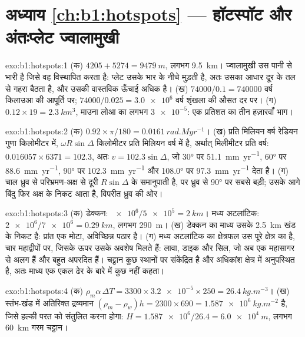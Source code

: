 \section*{अध्याय \ref{ch:b1:hotspots} --- हॉटस्पॉट और अंतःप्लेट ज्वालामुखी}

\begin{solution}{exo:b1:hotspots:1}
(क) $4205 + 5274 = \qty{9479}{m}$, लगभग \qty{9.5}{km}। ज्वालामुखी उस पानी से भारी है जिसे वह विस्थापित करता है: प्लेट उसके भार के नीचे मुड़ती है, अतः उसका आधार दूर के तल से गहरा बैठता है, और उसकी वास्तविक ऊँचाई अधिक है। (ख) $74000/0.1 = \num{740000}$ वर्ष किलाउआ की आपूर्ति पर; $74000/0.025 = \num{3.0e6}$ वर्ष शृंखला की औसत दर पर। (ग) $0.12\times19 = \qty{2.3}{km^3}$, माउना लोआ का लगभग $\num{3e-5}$: एक प्रतिशत का तीन हज़ारवाँ भाग।
\end{solution}

\begin{solution}{exo:b1:hotspots:2}
(क) $0.92\times\pi/180 = \qty{0.0161}{rad.Myr^{-1}}$। (ख) प्रति मिलियन वर्ष रेडियन गुणा किलोमीटर में, $\omega R\sin\Delta$ किलोमीटर प्रति मिलियन वर्ष में है, अर्थात् मिलीमीटर प्रति वर्ष: $0.016057\times6371 = 102.3$, अतः $v = 102.3\sin\Delta$, जो \ang{30} पर \qty{51.1}{mm.yr^{-1}}, \ang{60} पर \qty{88.6}{mm.yr^{-1}}, \ang{90} पर \qty{102.3}{mm.yr^{-1}} और \ang{108.0} पर \qty{97.3}{mm.yr^{-1}} देता है। (ग) चाल ध्रुव से परिभ्रमण-अक्ष से दूरी $R\sin\Delta$ के समानुपाती है,  पर ध्रुव से \ang{90} पर सबसे बड़ी; उसके आगे बिंदु फिर अक्ष के निकट आता है, विपरीत ध्रुव की ओर।
\end{solution}

\begin{solution}{exo:b1:hotspots:3}
(क) डेक्कन: $\num{e6}/\num{5e5} = \qty{2}{km}$। मध्य अटलांटिक: $\num{2e6}/\num{7e6} = \qty{0.29}{km}$, लगभग \qty{290}{m}। (ख) डेक्कन का माध्य उसके \qty{2.5}{km} खंड के निकट है: प्रांत एक मोटा, अविच्छिन्न पठार है। (ग) मध्य अटलांटिक का क्षेत्रफल उस पूरे क्षेत्र का है, चार महाद्वीपों पर, जिसके ऊपर उसके अवशेष मिलते हैं: लावा, डाइक और सिल, जो अब एक महासागर से अलग हैं और बहुत अपरदित हैं। चट्टान कुछ स्थानों पर संकेंद्रित है और अधिकांश क्षेत्र में अनुपस्थित है, अतः माध्य एक एकल ढेर के बारे में कुछ नहीं कहता।
\end{solution}

\begin{solution}{exo:b1:hotspots:4}
(क) $\rho_m\alpha\,\Delta T = 3300\times\num{3.2e-5}\times250 =
\qty{26.4}{kg.m^{-3}}$। (ख) स्तंभ-खंड में अतिरिक्त द्रव्यमान $(\rho_m - \rho_w)h = 2300\times690 = \qty{1.587e6}{kg.m^{-2}}$ है, जिसे हल्की परत को संतुलित करना होगा: $H = \num{1.587e6}/26.4 = \qty{6.0e4}{m}$, लगभग \qty{60}{km} गरम चट्टान।
\end{solution}

